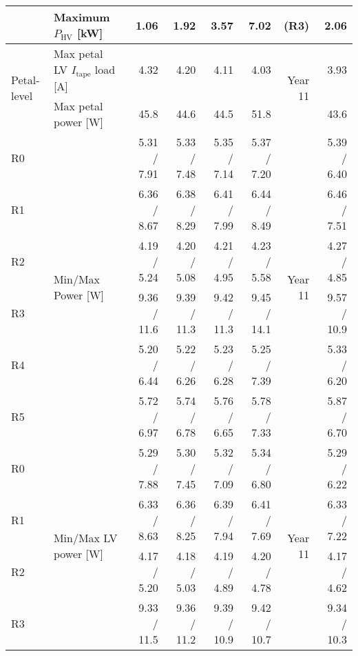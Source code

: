 \begin{table}[ht]
\begin{centering}
{\begin{tabular}{|l|l|r|r|r|r|r|r|}
                                & Maximum $P_\text{HV}$ [kW]                   &          1.06 &          1.92 &          3.57 &          7.02 & \bf (R3)     &          2.06 \\ \hline
\multirow{2}{*}{Petal-level}    & Max petal LV $I_\text{tape}$ load [A]        &          4.32 &          4.20 &          4.11 &          4.03 & \multirow{2}{*}{Year 11} &          3.93 \\ 
                                & Max petal power [W]                          &          45.8 &          44.6 &          44.5 &          51.8 &  &          43.6 \\ \hline
R0                              & \multirow{6}{*}{Min/Max Power [W]}           &   5.31 / 7.91 &   5.33 / 7.48 &   5.35 / 7.14 &   5.37 / 7.20 & \multirow{6}{*}{Year 11} &   5.39 / 6.40 \\ 
R1                              &                                              &   6.36 / 8.67 &   6.38 / 8.29 &   6.41 / 7.99 &   6.44 / 8.49 &  &   6.46 / 7.51 \\ 
R2                              &                                              &   4.19 / 5.24 &   4.20 / 5.08 &   4.21 / 4.95 &   4.23 / 5.58 &  &   4.27 / 4.85 \\ 
R3                              &                                              &   9.36 / 11.6 &   9.39 / 11.3 &   9.42 / 11.3 &   9.45 / 14.1 &  &   9.57 / 10.9 \\ 
R4                              &                                              &   5.20 / 6.44 &   5.22 / 6.26 &   5.23 / 6.28 &   5.25 / 7.39 &  &   5.33 / 6.20 \\ 
R5                              &                                              &   5.72 / 6.97 &   5.74 / 6.78 &   5.76 / 6.65 &   5.78 / 7.33 &  &   5.87 / 6.70 \\ \hline
R0                              & \multirow{6}{*}{Min/Max LV power [W]}        &   5.29 / 7.88 &   5.30 / 7.45 &   5.32 / 7.09 &   5.34 / 6.80 & \multirow{6}{*}{Year 11} &   5.29 / 6.22 \\ 
R1                              &                                              &   6.33 / 8.63 &   6.36 / 8.25 &   6.39 / 7.94 &   6.41 / 7.69 &  &   6.33 / 7.22 \\ 
R2                              &                                              &   4.17 / 5.20 &   4.18 / 5.03 &   4.19 / 4.89 &   4.20 / 4.78 &  &   4.17 / 4.62 \\ 
R3                              &                                              &   9.33 / 11.5 &   9.36 / 11.2 &   9.39 / 10.9 &   9.42 / 10.7 &  &   9.34 / 10.3 \\ 

\end{tabular}}
\end{centering}
\end{table}
